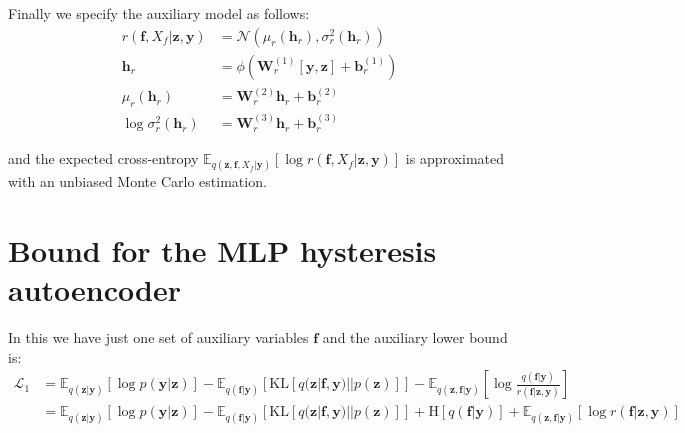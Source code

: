 \documentclass[12pt]{article}
\newcommand{\zb}{\mathbf{z}}
\newcommand{\fb}{\mathbf{f}}
\newcommand{\yb}{\mathbf{y}}
\newcommand{\Lo}{\mathcal{L}_1}
\newcommand{\Ex}{\mathbb{E}}
\newcommand{\KL}{\mathrm{KL}}
\newcommand{\No}{\mathcal{N}}
\newcommand{\Wb}{\mathbf{W}}
\newcommand{\hb}{\mathbf{h}}
\newcommand{\bb}{\mathbf{b}}
\begin{document}
%
Finally we specify the auxiliary model as follows:
%
\begin{align}
    r(\fb,X_f|\zb,\yb) &= \No(\mu_r(\hb_r), \sigma_r^2(\hb_r)) \\
    \hb_r &= \phi(\Wb^{(1)}_r [\yb,\zb] + \bb^{(1)}_r) \\
    \mu_r(\hb_r)&=\Wb^{(2)}_r \hb_r + \bb^{(2)}_r \\
    \log\sigma^2_r(\hb_r)&=\Wb^{(3)}_r \hb_r + \bb^{(3)}_r
\end{align}

and the expected cross-entropy $\Ex_{q(\zb,\fb,X_f|\yb)}\left[ \log r(\fb,X_f|\zb,\yb) \right]$ is approximated with an unbiased Monte Carlo estimation.
%
\section{Bound for the MLP hysteresis autoencoder}
%
In this we have just one set of auxiliary variables $\fb$ and the auxiliary lower bound is:
%
\begin{align}
    \Lo &= \Ex_{q(\zb|\yb)}[\log p(\yb|\zb)] - \Ex_{q(\fb|\yb)}\left[ \KL[q(\zb|\fb,\yb)||p(\zb)] \right] - \Ex_{q(\zb,\fb|\yb)}\left[ \log\frac{q(\fb|\yb)}{r(\fb|\zb,\yb)} \right]\\
    &= \Ex_{q(\zb|\yb)}[\log p(\yb|\zb)] - \Ex_{q(\fb|\yb)}\left[ \KL[q(\zb|\fb,\yb)||p(\zb)] \right] + \mathrm{H}[q(\fb|\yb)] + \Ex_{q(\zb,\fb|\yb)}[\log r(\fb|\zb,\yb)]
\end{align}
\end{document}
